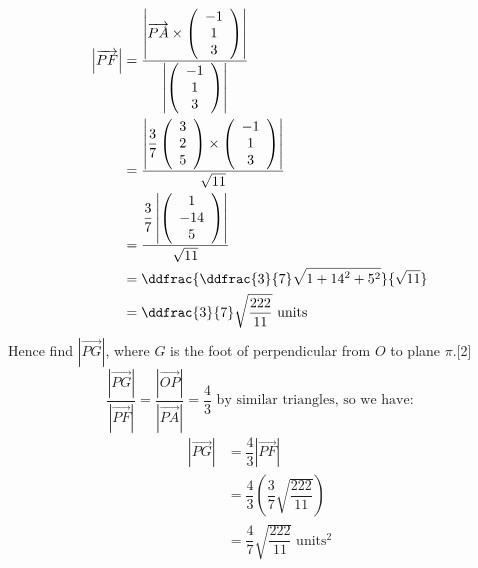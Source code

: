 \documentclass[12pt, a4 paper]{article}
\begin{document}
\begin{outline}[enumerate]
\begin{align*}
						\left| {\overrightarrow {PF} } \right| & = \dfrac{{\left| {\overrightarrow {PA}  \times \left( {\begin{array}{*{20}{c}}{ - 1} \\1\\3\end{array}} \right)} \right|}}{{\left| {\left( {\begin{array}{*{20}{c}}{ - 1}\\1\\3\end{array}} \right)} \right|}}\\ &= \dfrac{{\left| {\dfrac{3}{7}\left( {\begin{array}{*{20}{c}}3\\2\\5\end{array}} \right) \times \left( {\begin{array}{*{20}{c}}{ - 1}\\1\\3\end{array}} \right)} \right|}}{{\sqrt {11} }}\\ &= \dfrac{{\dfrac{3}{7}\left| {\left( {\begin{array}{*{20}{c}}1\\{ - 14}\\5\end{array}} \right)} \right|}}{{\sqrt {11} }}\\ &= \ddfrac{{\ddfrac{3}{7}\sqrt {1 + {{14}^2} + {5^2}} }}{{\sqrt {11} }}\\ &= \ddfrac{3}{7}\sqrt {\dfrac{{222}}{{11}}} {\textrm{ units}}
					\end{align*}
					\color{black}
					\2 Hence find $\left| {\overrightarrow {PG} } \right|$, where $G$ is the foot of perpendicular from $O$ to plane $\pi $.\hfill[2]
					\color{blue}
					\[\dfrac{{\left| {\overrightarrow {PG} } \right|}}{{\left| {\overrightarrow {PF} } \right|}} = \dfrac{{\left| {\overrightarrow {OP} } \right|}}{{\left| {\overrightarrow {PA} } \right|}} = \dfrac{4}{3}{\textrm{ by similar triangles, so we have:}}\]
					\begin{align*}
						\left| {\overrightarrow {PG} } \right| & = \dfrac{4}{3}\left| {\overrightarrow {PF} } \right| \\ &= \dfrac{4}{3}\left( {\dfrac{3}{7}\sqrt {\dfrac{{222}}{{11}}} } \right)\\ &= \dfrac{4}{7}\sqrt {\dfrac{{222}}{{11}}} \;{\textrm{unit}}{{\textrm{s}}^2}
					\end{align*}
					\color{black}


\end{outline}
\end{document}
